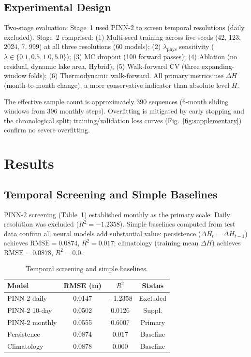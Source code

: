 \documentclass[conference,a4paper]{IEEEtran}
\begin{document}
\subsection{Experimental Design}

Two-stage evaluation: Stage~1 used PINN-2 to screen temporal resolutions (daily excluded). Stage~2 comprised: (1) Multi-seed training across five seeds (42, 123, 2024, 7, 999) at all three resolutions (60 models); (2) $\lambda_{\text{phys}}$ sensitivity ($\lambda{\in}\{0.1,0.5,1.0,5.0\}$); (3) MC dropout (100 forward passes); (4) Ablation (no residual, dynamic lake area, Hybrid); (5) Walk-forward CV (three expanding-window folds); (6) Thermodynamic walk-forward. All primary metrics use $\Delta H$ (month-to-month change), a more conservative indicator than absolute level $H$.

The effective sample count is approximately 390 sequences (6-month sliding windows from 396 monthly steps). Overfitting is mitigated by early stopping and the chronological split; training/validation loss curves (Fig.~\ref{fig:supplementary}) confirm no severe overfitting.

\section{Results}

\subsection{Temporal Screening and Simple Baselines}

PINN-2 screening (Table~\ref{tab:screening}) established monthly as the primary scale. Daily resolution was excluded ($R^2{=}{-}1.2358$). Simple baselines computed from test data confirm all neural models add substantial value: persistence ($\Delta H_t{=}\Delta H_{t-1}$) achieves $\text{RMSE}{=}0.0874$, $R^2{=}0.017$; climatology (training mean $\Delta H$) achieves $\text{RMSE}{=}0.0878$, $R^2{=}0.0$.

\begin{table}[htbp]
\centering
\caption{Temporal screening and simple baselines.}
\label{tab:screening}
\begin{tabular}{lccc}
\toprule
\textbf{Model} & \textbf{RMSE (m)} & \textbf{$R^2$} & \textbf{Status} \\
\midrule
PINN-2 daily      & 0.0147 & $-$1.2358 & Excluded \\
PINN-2 10-day     & 0.0502 & 0.0126    & Suppl. \\
PINN-2 monthly    & 0.0555 & 0.6007    & Primary \\
Persistence       & 0.0874 & 0.017     & Baseline \\
Climatology       & 0.0878 & 0.000     & Baseline \\
\bottomrule
\end{tabular}
\end{table}
\end{document}
